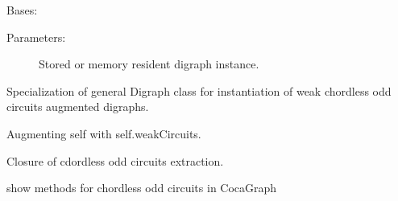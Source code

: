 \documentclass[letterpaper,10pt,english]{sphinxmanual}
\begin{document}
\begin{fulllineitems}
\label{techDoc:digraphs.WeakCocaDigraph}
Bases: {\hyperref[techDoc:digraphs.Digraph]{}}
\begin{description}
\item[{Parameters:}] \leavevmode
Stored or memory resident digraph instance.

\end{description}

Specialization of general Digraph class for instantiation
of weak chordless odd circuits augmented digraphs.

\begin{fulllineitems}
\label{techDoc:digraphs.WeakCocaDigraph.addWeakCircuits}
Augmenting self with self.weakCircuits.

\end{fulllineitems}


\begin{fulllineitems}
\label{techDoc:digraphs.WeakCocaDigraph.closureWeakChordlessOddCircuits}
Closure of cdordless odd circuits extraction.

\end{fulllineitems}


\begin{fulllineitems}
\label{techDoc:digraphs.WeakCocaDigraph.showCircuits}
show methods for chordless odd circuits in CocaGraph

\end{fulllineitems}


\end{fulllineitems}

\end{document}
